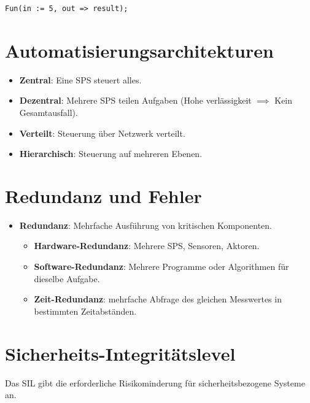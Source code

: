 \documentclass[9pt, a3paper, landscape]{article}
\newcommand{\algo}[1]{\textbf{\textcolor{blue!60!black}{#1}}}
\newcommand{\datastruct}[1]{\textbf{\textcolor{red!60!black}{#1}}}
\begin{document}
\begin{multicols*}{4}
\begin{itemize}
\begin{itemize}
\begin{itemize}
\begin{lstlisting}[language=ST, numbers=none]
Fun(in := 5, out => result);

    \end{lstlisting}
\end{itemize}

\section{Automatisierungsarchitekturen}

\begin{itemize}
    \item \datastruct{Zentral}: Eine SPS steuert alles.
    \item \datastruct{Dezentral}: Mehrere SPS teilen Aufgaben (Hohe verlässigkeit $\implies$ Kein Gesamtausfall).
    \item \datastruct{Verteilt}: Steuerung über Netzwerk verteilt.
    \item \datastruct{Hierarchisch}: Steuerung auf mehreren Ebenen.
\end{itemize}

\section{Redundanz und Fehler}

\begin{itemize}
\item \algo{Redundanz}: Mehrfache Ausführung von kritischen Komponenten.
\begin{itemize}
    \item \datastruct{Hardware-Redundanz}: Mehrere SPS, Sensoren, Aktoren.
    \item \datastruct{Software-Redundanz}: Mehrere Programme oder Algorithmen für dieselbe Aufgabe.
    \item \datastruct{Zeit-Redundanz}: mehrfache Abfrage des gleichen Messwertes in bestimmten Zeitabständen.
\end{itemize}

\end{itemize}

\section{Sicherheits-Integritätslevel}
Das SIL gibt die erforderliche Risikominderung für sicherheitsbezogene Systeme an.


\end{itemize}
\end{itemize}
\end{multicols*}
\end{document}
